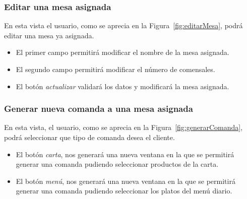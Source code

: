  \subsubsection*{Editar una mesa asignada}
 En esta vista el usuario, como se aprecia en la Figura~\ref{fig:editarMesa}, podrá editar una mesa ya asignada.

 \begin{itemize} 

\item El primer campo permitirá modificar el nombre de la mesa asignada.
 
 \item El segundo campo permitirá modificar el número de comensales.
 
\item El botón \textit{actualizar} validará los datos y modificará la mesa asignada.
 
\end{itemize}
 

\subsubsection*{Generar nueva comanda a una mesa asignada}
 En esta vista, el usuario, como se aprecia en la Figura~\ref{fig:generarComanda}, podrá seleccionar que tipo de comanda desea el cliente.

 
 \begin{itemize} 

\item El botón \textit{carta}, nos generará una nueva ventana en la que se permitirá generar una comanda pudiendo seleccionar productos de la carta.
 
\item El botón \textit{menú}, nos generará una nueva ventana en la que se permitirá generar una comanda pudiendo seleccionar los platos del menú diario.

\end{itemize}

